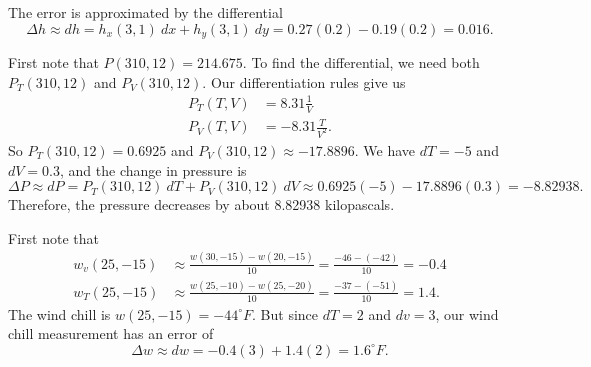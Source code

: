 \begin{activitySolution}
\ba
\item The error is approximated by the differential 
\[\Delta h \approx dh = h_x(3,1)~dx + h_y(3,1)~dy = 0.27(0.2) - 0.19(0.2) = 0.016.\]

\item First note that $P(310,12) = 214.675$. To find the differential, we need both $P_T(310,12)$ and $P_V(310,12)$. Our differentiation rules give us 
\begin{align*}
P_T(T,V) &= 8.31\frac{1}{V} \\
P_V(T,V) &= -8.31\frac{T}{V^2}.
\end{align*}
So $P_T(310,12) = 0.6925$ and $P_V(310,12) \approx -17.8896$. We have $dT = -5$ and $dV = 0.3$, and the change in pressure is 
\[\Delta P \approx dP = P_T(310,12)~dT + P_V(310,12)~dV \approx 0.6925(-5) - 17.8896(0.3) = -8.82938.\]
Therefore, the pressure decreases by about 8.82938 kilopascals.

\item First note that 
\begin{align*}
w_v(25,-15) &\approx \frac{w(30,-15)-w(20,-15)}{10} = \frac{-46-(-42)}{10} = -0.4 \\
w_T(25,-15) &\approx \frac{w(25,-10)-w(25,-20)}{10} = \frac{-37-(-51)}{10} = 1.4.
\end{align*}
The wind chill is $w(25,-15) = -44^{\circ}F$. But since $dT = 2$ and $dv = 3$, our wind chill measurement has an error of
\[\Delta w \approx dw = -0.4(3) + 1.4(2) = 1.6^{\circ}F.\]


\ea
\end{activitySolution}

\aftera
